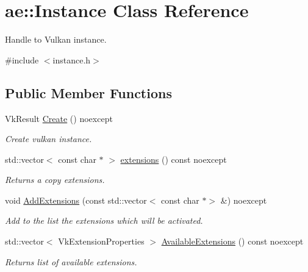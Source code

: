 \hypertarget{classae_1_1_instance}{}\section{ae\+:\+:Instance Class Reference}
\label{classae_1_1_instance}


Handle to Vulkan instance.  




{\ttfamily \#include $<$instance.\+h$>$}

\subsection*{Public Member Functions}
\begin{DoxyCompactItemize}
\item 
\hypertarget{classae_1_1_instance_a9de8fa013e11a71aa6e09f142aa1a927}{}\label{classae_1_1_instance_a9de8fa013e11a71aa6e09f142aa1a927} 
Vk\+Result \hyperlink{classae_1_1_instance_a9de8fa013e11a71aa6e09f142aa1a927}{Create} () noexcept
\begin{DoxyCompactList}\small\item\em Create vulkan instance. \end{DoxyCompactList}\item 
\hypertarget{classae_1_1_instance_a0aaff634cda5a58a37ae93b2f577721d}{}\label{classae_1_1_instance_a0aaff634cda5a58a37ae93b2f577721d} 
std\+::vector$<$ const char $\ast$ $>$ \hyperlink{classae_1_1_instance_a0aaff634cda5a58a37ae93b2f577721d}{extensions} () const noexcept
\begin{DoxyCompactList}\small\item\em Returns a copy extensions. \end{DoxyCompactList}\item 
void \hyperlink{classae_1_1_instance_a880ed1eaf9b821ac616865821a5f15ef}{Add\+Extensions} (const std\+::vector$<$ const char $\ast$$>$ \&) noexcept
\begin{DoxyCompactList}\small\item\em Add to the list the extensions which will be activated. \end{DoxyCompactList}\item 
\hypertarget{classae_1_1_instance_a1546a926e92a106a3829ce6b8729de42}{}\label{classae_1_1_instance_a1546a926e92a106a3829ce6b8729de42} 
std\+::vector$<$ Vk\+Extension\+Properties $>$ \hyperlink{classae_1_1_instance_a1546a926e92a106a3829ce6b8729de42}{Available\+Extensions} () const noexcept
\begin{DoxyCompactList}\small\item\em Returns list of available extensions. \end{DoxyCompactList}\item 
$$
\end{DoxyCompactItemize}
